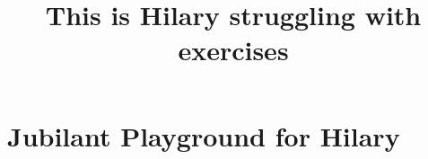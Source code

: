 \documentclass[10pt,handout,twocolumn,twoside,wordchoicegiven]{xourse}
\title{This is Hilary struggling with exercises}
\begin{document}
\maketitle

\setcounter{tocdepth}{2}

\part{Jubilant Playground for Hilary}

{}






\iftikzexport\else\printindex\fi
\end{document}
